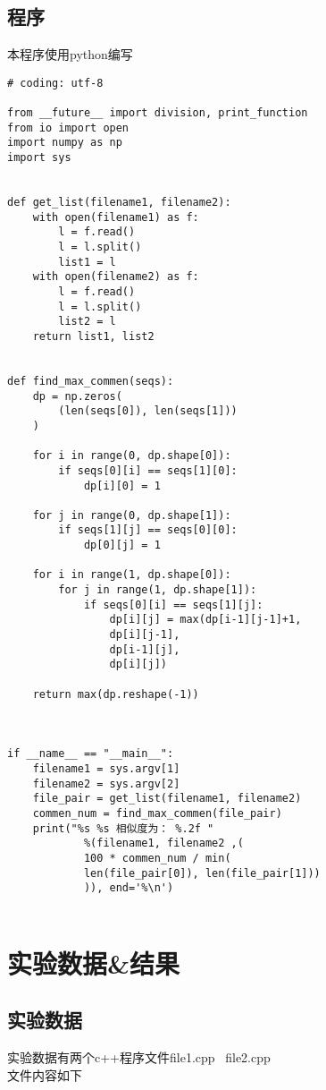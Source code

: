 \documentclass[UTF8]{ctexart}
\begin{document}
\subsection{程序}
本程序使用python编写
\lstset{language=python,
	frame=shadowbox}
\begin{lstlisting}
# coding: utf-8

from __future__ import division, print_function
from io import open
import numpy as np
import sys


def get_list(filename1, filename2):
    with open(filename1) as f:
        l = f.read()
        l = l.split()
        list1 = l
    with open(filename2) as f:
        l = f.read()
        l = l.split()
        list2 = l
    return list1, list2


def find_max_commen(seqs):
    dp = np.zeros(
        (len(seqs[0]), len(seqs[1])) 
    )
    
    for i in range(0, dp.shape[0]):
        if seqs[0][i] == seqs[1][0]:
            dp[i][0] = 1
    
    for j in range(0, dp.shape[1]):
        if seqs[1][j] == seqs[0][0]:
            dp[0][j] = 1
    
    for i in range(1, dp.shape[0]):
        for j in range(1, dp.shape[1]):
            if seqs[0][i] == seqs[1][j]:
                dp[i][j] = max(dp[i-1][j-1]+1, 
				dp[i][j-1], 
				dp[i-1][j], 
				dp[i][j])
    
    return max(dp.reshape(-1))



if __name__ == "__main__":
    filename1 = sys.argv[1]
    filename2 = sys.argv[2]
    file_pair = get_list(filename1, filename2)
    commen_num = find_max_commen(file_pair)
    print("%s %s 相似度为： %.2f " 
    		%(filename1, filename2 ,(
        	100 * commen_num / min(
        	len(file_pair[0]), len(file_pair[1]))
         	)), end='%\n')


\end{lstlisting}
\section{实验数据\&结果}

\subsection{实验数据}
实验数据有两个c++程序文件file1.cpp \ file2.cpp
\\
文件内容如下
\end{document}
